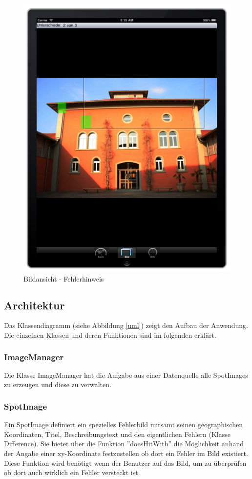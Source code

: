 \begin{figure}[H]
  \centering
  \includegraphics[width=1.0\textwidth]{bilder/screen4.jpg}
  \caption{Bildansicht - Fehlerhinweis}
  \label{imageviewscreen3}
\end{figure}

\subsection{Architektur}
Das Klassendiagramm (siehe Abbildung \ref{uml}) zeigt den Aufbau der Anwendung. Die einzelnen Klassen und deren Funktionen sind im folgenden erklärt.

\subsubsection*{ImageManager}
Die Klasse ImageManager hat die Aufgabe aus einer Datenquelle alle SpotImages zu erzeugen und diese zu verwalten.

\subsubsection*{SpotImage}
Ein SpotImage definiert ein spezielles Fehlerbild mitsamt seinen geographischen Koordinaten, Titel, Beschreibungstext und den eigentlichen Fehlern (Klasse Difference). Sie bietet über die Funktion ''doesHitWith'' die Möglichkeit anhand der Angabe einer xy-Koordinate festzustellen ob dort ein Fehler im Bild existiert. Diese Funktion wird benötigt wenn der Benutzer auf das Bild, um zu überprüfen ob dort auch wirklich ein Fehler versteckt ist.

